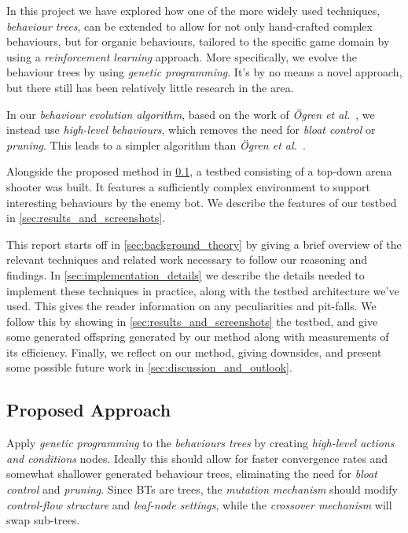 \documentclass[a4paper, twocolumn]{article}
\begin{document}
    In this project we have explored how one of the more widely used techniques, \emph{behaviour trees}, can be extended to allow for not only hand-crafted complex behaviours, but for organic behaviours, tailored to the specific game domain by using a \emph{reinforcement learning} approach. More specifically, we evolve the behaviour trees by using \emph{genetic programming}. It's by no means a novel approach, but there still has been relatively little research in the area. 

    In our \emph{behaviour evolution algorithm}, based on the work of \emph{{\"O}gren et al.}~\cite{colledanchise2015learning}, we instead use \emph{high-level behaviours}, which removes the need for \emph{bloat control} or \emph{pruning}. This leads to a simpler algorithm than \emph{{\"O}gren et al.}~\cite{colledanchise2015learning}.

    Alongside the proposed method in \cref{sec:proposed_approach}, a testbed consisting of a top-down arena shooter was built. It features a sufficiently complex environment to support interesting behaviours by the enemy bot. We describe the features of our testbed in \cref{sec:results_and_screenshots}.

    This report starts off in \cref{sec:background_theory} by giving a brief overview of the relevant techniques and related work necessary to follow our reasoning and findings. In \cref{sec:implementation_details} we describe the details needed to implement these techniques in practice, along with the testbed architecture we've used. This gives the reader information on any peculiarities and pit-falls. We follow this by showing in \cref{sec:results_and_screenshots} the testbed, and give some generated offspring generated by our method along with measurements of its efficiency. Finally, we reflect on our method, giving downsides, and present some possible future work in \cref{sec:discussion_and_outlook}.

    \subsection{Proposed Approach} \label{sec:proposed_approach}

    Apply \emph{genetic programming} to the \emph{behaviours trees} by creating \emph{high-level actions and conditions} nodes. Ideally this should allow for faster convergence rates and somewhat shallower generated behaviour trees, eliminating the need for \emph{bloat control} and \emph{pruning}. Since BTs are trees, the \emph{mutation mechanism} should modify \emph{control-flow structure} and \emph{leaf-node settings}, while the \emph{crossover mechanism} will swap sub-trees.
\end{document}
